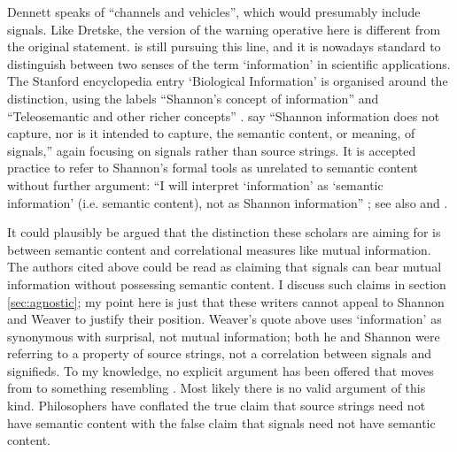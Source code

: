 \documentclass[12pt]{article}
\begin{document}
\noindent Dennett speaks of ``channels and vehicles'', which would presumably include signals.
Like Dretske, the version of the warning operative here is different from the original statement.
\citet[$\S$6]{dennett2017bacteria} is still pursuing this line, and it is nowadays standard to distinguish between two senses of the term `information' in scientific applications.
The Stanford encyclopedia entry `Biological Information' is organised around the distinction, using the labels ``Shannon's concept of information'' and ``Teleosemantic and other richer concepts'' \citep{godfrey-smith2016biological}.
\citet[21]{piccinini2011information} say ``Shannon information does not capture, nor is it intended to capture, the semantic content, or meaning, of signals,'' again focusing on signals rather than source strings.
It is accepted practice to refer to Shannon's formal tools as unrelated to semantic content without further argument: ``I will interpret ‘information’ as ‘semantic information’ (i.e. semantic content), not as Shannon information'' \citep[p. 12 n. 14]{artiga2020signals}; see also \citet[6]{cao2020new} and \citet[1]{kolchinsky2018semantic}.

It could plausibly be argued that the distinction these scholars are aiming for is between semantic content and correlational measures like mutual information.
The authors cited above could be read as claiming that signals can bear mutual information without possessing semantic content.
I discuss such claims in section \ref{sec:agnostic}; my point here is just that these writers cannot appeal to Shannon and Weaver to justify their position.
Weaver's quote above uses `information' as synonymous with surprisal, not mutual information; both he and Shannon were referring to a property of source strings, not a correlation between signals and signifieds.
To my knowledge, no explicit argument has been offered that moves from \sw{} to something resembling \tic{}.
Most likely there is no valid argument of this kind.
Philosophers have conflated the true claim that source strings need not have semantic content with the false claim that signals need not have semantic content.
\end{document}
